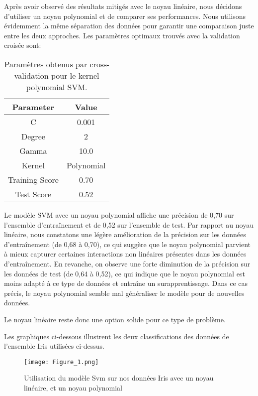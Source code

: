 \documentclass{article}
\begin{document}
Après avoir observé des résultats mitigés avec le noyau linéaire, nous décidons d’utiliser un noyau polynomial et de comparer ses performances. Nous utilisons évidemment la même séparation des données pour garantir une comparaison juste entre les deux approches.
\newpage
Les paramètres optimaux trouvés avec la validation croisée sont: 
\begin{table}[H]
\centering
\begin{tabular}{|c|c|}
\hline
\textbf{Parameter} & \textbf{Value} \\ \hline
C                  & 0.001          \\ \hline
Degree             & 2              \\ \hline
Gamma              & 10.0           \\ \hline
Kernel             & Polynomial     \\ \hline
Training Score     & 0.70           \\ \hline
Test Score         & 0.52           \\ \hline
\end{tabular}
\caption{Paramètres obtenus par cross-validation pour le kernel polynomial SVM.}
\label{tab:poly_kernel_params}
\end{table}

Le modèle SVM avec un noyau polynomial affiche une précision de 0,70 sur l'ensemble d'entraînement et de 0,52 sur l'ensemble de test. Par rapport au noyau linéaire, nous constatons une légère amélioration de la précision sur les données d'entraînement (de 0,68 à 0,70), ce qui suggère que le noyau polynomial parvient à mieux capturer certaines interactions non linéaires présentes dans les données d'entraînement.
En revanche, on observe une forte diminution de la précision sur les données de test (de 0,64 à 0,52), ce qui indique que le noyau polynomial est moins adapté à ce type de données et entraîne un surapprentissage. Dans ce cas précis, le noyau polynomial semble mal généraliser le modèle pour de nouvelles données.

Le noyau linéaire reste donc une option solide pour ce type de problème.

Les graphiques ci-dessous illustrent les deux classifications des données de l'ensemble Iris utilisées ci-dessus.

\begin{figure}[H]
    \centering
    \texttt{[image: Figure\_1.png]}
    \caption{Utilisation du modèle Svm sur nos données Iris avec un noyau linéaire, et un noyau polynomial}
    \label{fig:enter-label}
\end{figure}
\newpage
\end{document}
